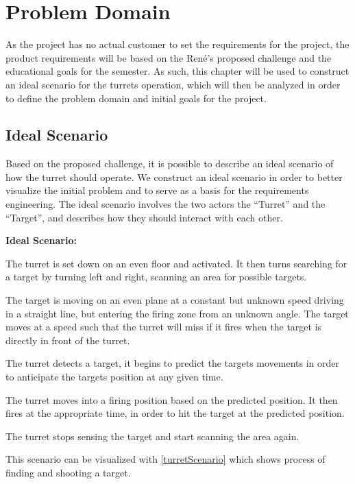 \chapter{Problem Domain}\label{ProblemDomain}
As the project has no actual customer to set the requirements for the project,
the product requirements will be based on the Ren\'e's proposed challenge and
the educational goals for the semester.\nl 
As such, this chapter will be used to construct an ideal scenario for the
turrets operation, which will then be analyzed in order to define the problem
domain and initial goals for the project.

\section{Ideal Scenario}
Based on the proposed challenge, it is possible to describe an ideal scenario
of how the turret should operate. We construct an ideal scenario in order to better
visualize the initial problem and to serve as a basis for the requirements engineering.
The ideal scenario involves the two actors the ``Turret'' and the ``Target'',
and describes how they should interact with each other.

\begin{center}
\colorbox{diff}{
\begin{minipage}{0.8\linewidth}
\textbf{Ideal Scenario:}

The turret is set down on an even floor and activated. It then turns searching
for a target by turning left and right, scanning an area for possible
targets.\nl

The target is moving on an even plane at a constant but unknown speed driving
in a straight line, but entering the firing zone from an unknown angle. The
target moves at a speed such that the turret will miss if it fires when the
target is directly in front of the turret.\nl

The turret detects a target, it begins to predict the targets movements in
order to anticipate the targets position at any given time.\nl

The turret moves into a firing position based on the predicted position. It then
fires at the appropriate time, in order to hit the target at the predicted
position.\nl

The turret stops sensing the target and start scanning the area again.
\end{minipage}
}
\end{center}

This scenario can be visualized with \autoref{turretScenario} which shows process of
finding and shooting a target.

